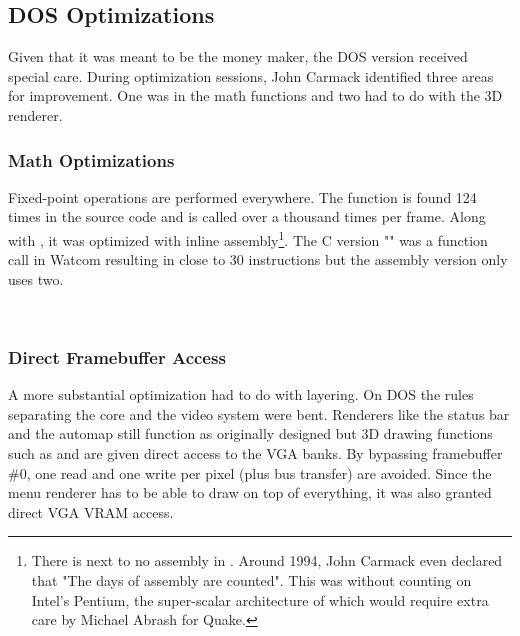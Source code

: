 \subsection{DOS Optimizations}
Given that it was meant to be the money maker, the DOS version received special care. During optimization sessions, John Carmack identified three areas for improvement. One was in the math functions and two had to do with the 3D renderer.\\
 \par
\par




\subsubsection{Math Optimizations}
Fixed-point operations are performed everywhere. The function  is found 124 times in the source code and is called over a thousand times per frame. Along with , it was optimized with inline assembly\footnote{There is next to no assembly in \doom. Around 1994, John Carmack even declared that "The days of assembly are counted". This was without counting on Intel's Pentium, the super-scalar architecture of which would require extra care by Michael Abrash for Quake.}. The C version "" was a function call in Watcom resulting in close to 30 instructions but the assembly version only uses two.\\
\par
{}\\


\vspace{-2mm}
\subsubsection{Direct Framebuffer Access}
A more substantial optimization had to do with layering. On DOS the rules separating the core and the video system were bent. Renderers like the status bar and the automap still function as originally designed but 3D drawing functions such as  and  are given direct access to the VGA banks. By bypassing framebuffer \#0, one read and one write per pixel (plus bus transfer) are avoided. Since the menu renderer has to be able to draw on top of everything, it was also granted direct VGA VRAM access.\\

